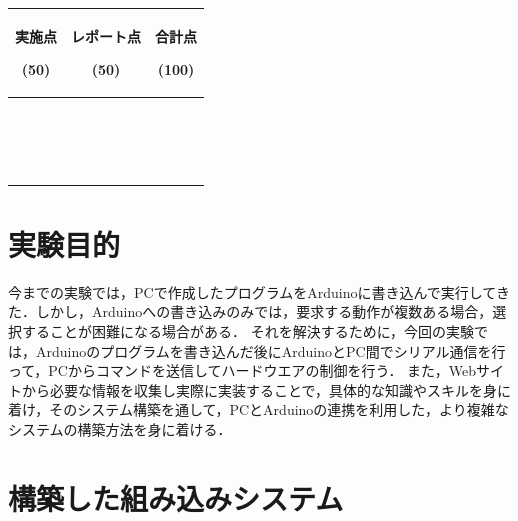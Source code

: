 \documentclass{ltjsarticle}
\begin{document}
\begin{center}
    \begin{tabularx}{100mm}{|C|C|C|} \hline
        実施点\par(50)  & レポート点\par(50) & 合計点\par(100) \\ \hline
        \ \par\ \par &               &              \\ \hline
    \end{tabularx}
\end{center}

\newpage
\section{実験目的}

今までの実験では，PCで作成したプログラムをArduinoに書き込んで実行してきた．しかし，Arduinoへの書き込みのみでは，要求する動作が複数ある場合，選択することが困難になる場合がある．
それを解決するために，今回の実験では，Arduinoのプログラムを書き込んだ後にArduinoとPC間でシリアル通信を行って，PCからコマンドを送信してハードウエアの制御を行う．
また，Webサイトから必要な情報を収集し実際に実装することで，具体的な知識やスキルを身に着け，そのシステム構築を通して，PCとArduinoの連携を利用した，より複雑なシステムの構築方法を身に着ける．


\section{構築した組み込みシステム}
\end{document}
